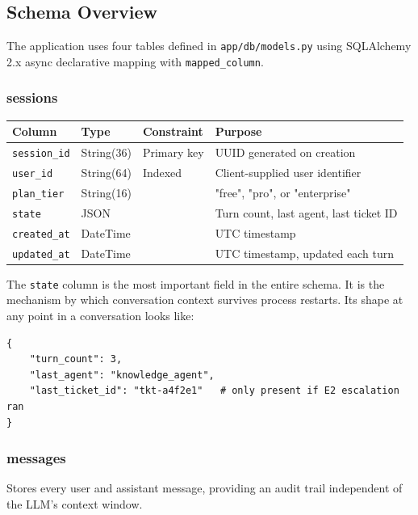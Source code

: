 \documentclass[12pt,a4paper]{article}
\begin{document}
\subsection{Schema Overview}

The application uses four tables defined in \texttt{app/db/models.py} using SQLAlchemy 2.x async declarative mapping with \texttt{mapped\_column}.

\subsubsection{sessions}

\begin{center}
\begin{tabular}{llll}
\toprule
\textbf{Column} & \textbf{Type} & \textbf{Constraint} & \textbf{Purpose} \\
\midrule
\texttt{session\_id} & String(36) & Primary key & UUID generated on creation \\
\texttt{user\_id} & String(64) & Indexed & Client-supplied user identifier \\
\texttt{plan\_tier} & String(16) & & "free", "pro", or "enterprise" \\
\texttt{state} & JSON & & Turn count, last agent, last ticket ID \\
\texttt{created\_at} & DateTime & & UTC timestamp \\
\texttt{updated\_at} & DateTime & & UTC timestamp, updated each turn \\
\bottomrule
\end{tabular}
\end{center}

The \texttt{state} column is the most important field in the entire schema. It is the mechanism by which conversation context survives process restarts. Its shape at any point in a conversation looks like:

\begin{lstlisting}[style=python, numbers=none]
{
    "turn_count": 3,
    "last_agent": "knowledge_agent",
    "last_ticket_id": "tkt-a4f2e1"   # only present if E2 escalation ran
}
\end{lstlisting}

\subsubsection{messages}

Stores every user and assistant message, providing an audit trail independent of the LLM's context window.
\end{document}

